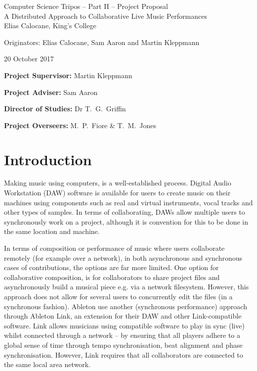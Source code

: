 \documentclass[12pt,a4paper,twoside]{article}
\begin{document}
\begin{center}
\Large
Computer Science Tripos -- Part II -- Project Proposal\\[4mm]
\LARGE
A Distributed Approach to Collaborative Live Music Performances\\[4mm]

\large
Elias Calocane, King's College

Originators: Elias Calocane, Sam Aaron and Martin Kleppmann

20 October 2017
\end{center}

\vspace{5mm}

\textbf{Project Supervisor:} Martin Kleppmann

\textbf{Project Adviser:} Sam Aaron

\textbf{Director of Studies:} Dr T.~G.~Griffin

\textbf{Project Overseers:} M.~P.~Fiore  \& T.~M.~Jones


\section*{Introduction}

Making music using computers, is a well-established process. Digital Audio Workstation (DAW) software is available for users to create music on their machines using components such as real and virtual instruments, vocal tracks and other types of samples. In terms of collaborating, DAWs allow multiple users to synchronously work on a project, although it is convention for this to be done in the same location and machine.

In terms of composition or performance of music where users collaborate remotely (for example over a network), in both asynchronous and synchronous cases of contributions, the options are far more limited. One option for collaborative composition, is for collaborators to share project files and asynchronously build a musical piece e.g. via a network filesystem. However, this approach does not allow for several users to concurrently edit the files (in a synchronous fashion). Ableton use another (synchronous performance) approach through Ableton Link, an extension for their DAW and other Link-compatible software. Link allows musicians using compatible software to play in sync (live) whilst connected through a network -- by ensuring that all players adhere to a global sense of time through tempo synchronisation, beat alignment and phase synchronisation. However, Link requires that all collaborators are connected to the same local area network.
\end{document}
